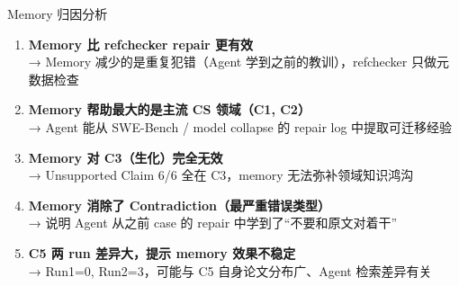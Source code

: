 \documentclass[UTF8,fontset=fandol,aspectratio=169]{ctexbeamer}
\begin{document}
\begin{frame}{Memory 归因分析}
  \begin{enumerate}
    \setlength{\itemsep}{6pt}
    \item \textbf{Memory 比 refchecker repair 更有效}\\
    \quad → Memory 减少的是重复犯错（Agent 学到之前的教训），refchecker 只做元数据检查

    \item \textbf{Memory 帮助最大的是主流 CS 领域（C1, C2）}\\
    \quad → Agent 能从 SWE-Bench / model collapse 的 repair log 中提取可迁移经验

    \item \textbf{Memory 对 C3（生化）完全无效}\\
    \quad → Unsupported Claim 6/6 全在 C3，memory 无法弥补领域知识鸿沟

    \item \textbf{Memory 消除了 Contradiction（最严重错误类型）}\\
    \quad → 说明 Agent 从之前 case 的 repair 中学到了“不要和原文对着干”

    \item \textbf{C5 两 run 差异大，提示 memory 效果不稳定}\\
    \quad → Run1=0, Run2=3，可能与 C5 自身论文分布广、Agent 检索差异有关
  \end{enumerate}
\end{frame}
\end{document}
